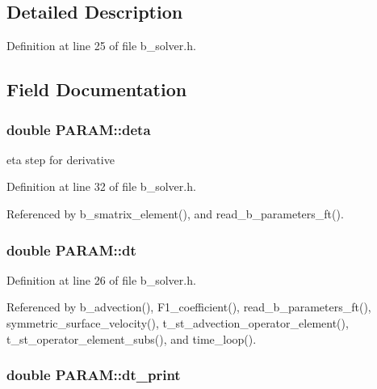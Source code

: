 \subsection{Detailed Description}


Definition at line 25 of file b\-\_\-solver.\-h.



\subsection{Field Documentation}
\hypertarget{struct_p_a_r_a_m_af23ff99642425900011aff1b51438e43}{
\subsubsection[{deta}]{\setlength{\rightskip}{0pt plus 5cm}double P\-A\-R\-A\-M\-::deta}}\label{struct_p_a_r_a_m_af23ff99642425900011aff1b51438e43}
eta step for derivative 

Definition at line 32 of file b\-\_\-solver.\-h.



Referenced by b\-\_\-smatrix\-\_\-element(), and read\-\_\-b\-\_\-parameters\-\_\-ft().

\hypertarget{struct_p_a_r_a_m_a0348912407bf4a61261b92feccdaf092}{
\subsubsection[{dt}]{\setlength{\rightskip}{0pt plus 5cm}double P\-A\-R\-A\-M\-::dt}}\label{struct_p_a_r_a_m_a0348912407bf4a61261b92feccdaf092}


Definition at line 26 of file b\-\_\-solver.\-h.



Referenced by b\-\_\-advection(), F1\-\_\-coefficient(), read\-\_\-b\-\_\-parameters\-\_\-ft(), symmetric\-\_\-surface\-\_\-velocity(), t\-\_\-st\-\_\-advection\-\_\-operator\-\_\-element(), t\-\_\-st\-\_\-operator\-\_\-element\-\_\-subs(), and time\-\_\-loop().

\hypertarget{struct_p_a_r_a_m_af11d7ff309c45584f064aaf31ce0bfae}{
\subsubsection[{dt\-\_\-print}]{\setlength{\rightskip}{0pt plus 5cm}double P\-A\-R\-A\-M\-::dt\-\_\-print}}\label{struct_p_a_r_a_m_af11d7ff309c45584f064aaf31ce0bfae}


